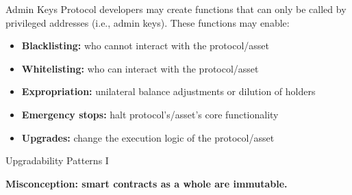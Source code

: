 \documentclass[]{beamer}
\begin{document}

\begin{frame}{Admin Keys}
	Protocol developers may create functions that can only be called by privileged addresses (i.e., admin keys). These functions may enable:
	\begin{itemize}
		\item \textbf{Blacklisting:} who cannot interact with the protocol/asset
		\item \textbf{Whitelisting:} who can interact with the protocol/asset
		\item \textbf{Expropriation:} unilateral balance adjustments or dilution of holders
		\item \textbf{Emergency stops:} halt protocol's/asset's core functionality
		\item \textbf{Upgrades:} change the execution logic of the protocol/asset
	\end{itemize}
\end{frame}

\begin{frame}{Upgradability Patterns I}

	\textbf{Misconception: smart contracts as a whole are immutable.}\\
	
	\vspace{1em}
	
	
	\vspace{1em}


\end{frame}
\end{document}
